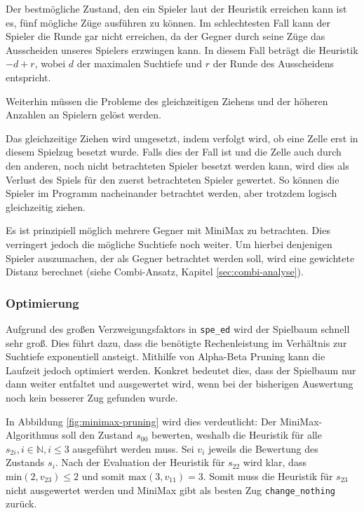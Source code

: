 \documentclass[12pt,a4paper]{article}
\begin{document}
Der bestmögliche Zustand, den ein Spieler laut der Heuristik erreichen kann ist es, fünf mögliche Züge ausführen zu können. Im schlechtesten Fall kann der Spieler die Runde gar nicht erreichen, da der Gegner durch seine Züge das Ausscheiden unseres Spielers erzwingen kann. In diesem Fall beträgt die Heuristik $-d + r$, wobei $d$ der maximalen Suchtiefe und $r$ der Runde des Ausscheidens entspricht.

Weiterhin müssen die Probleme des gleichzeitigen Ziehens und der höheren Anzahlen an Spielern gelöst werden.

Das gleichzeitige Ziehen wird umgesetzt, indem verfolgt wird, ob eine Zelle erst in diesem Spielzug besetzt wurde. Falls dies der Fall ist und die Zelle auch durch den anderen, noch nicht betrachteten Spieler besetzt werden kann, wird dies als Verlust des Spiels für den zuerst betrachteten Spieler gewertet. So können die Spieler im Programm nacheinander betrachtet werden, aber trotzdem logisch gleichzeitig ziehen.

Es ist prinzipiell möglich mehrere Gegner mit MiniMax zu betrachten. Dies verringert jedoch die mögliche Suchtiefe noch weiter. Um hierbei denjenigen Spieler auszumachen, der als Gegner betrachtet werden soll, wird eine gewichtete Distanz berechnet (siehe Combi-Ansatz, Kapitel \ref{sec:combi-analyse}). 


\subsubsection{Optimierung}
Aufgrund des großen Verzweigungsfaktors in \texttt{spe\_ed} wird der Spielbaum schnell sehr groß. Dies führt dazu, dass die benötigte Rechenleistung im Verhältnis zur Suchtiefe exponentiell ansteigt. Mithilfe von Alpha-Beta Pruning kann die Laufzeit jedoch optimiert werden. Konkret bedeutet dies, dass der Spielbaum nur dann weiter entfaltet und ausgewertet wird, wenn bei der bisherigen Auswertung noch kein besserer Zug gefunden wurde.

In Abbildung \ref{fig:minimax-pruning} wird dies verdeutlicht: Der MiniMax-Algorithmus soll den Zustand $s_{00}$ bewerten, weshalb die Heuristik für alle $s_{2i}, i \in \mathbb{N}, i \leq 3$ ausgeführt werden muss. Sei $v_i$ jeweils die Bewertung des Zustands $s_i$. Nach der Evaluation der Heuristik für $s_{22}$ wird klar, dass $\textrm{min}(2,v_ {23}) \leq 2$ und somit $\textrm{max}(3,v_{11}) = 3$. Somit muss die Heuristik für $s_{23}$ nicht ausgewertet werden und MiniMax gibt als besten Zug \texttt{change\_nothing} zurück.
\end{document}
